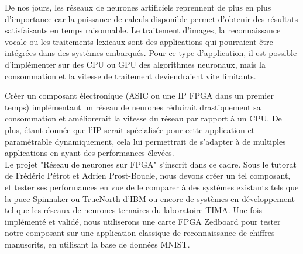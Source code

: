 De nos jours, les réseaux de neurones artificiels reprennent de plus en plus d'importance car la puissance de calculs disponible permet d'obtenir des résultats satisfaisants en temps raisonnable.
Le traitement d'images, la reconnaissance vocale ou les traitements lexicaux sont
des applications qui pourraient être intégrées dans des systèmes embarqués. Pour ce type d'application, il est possible
d'implémenter sur des CPU ou GPU des algorithmes neuronaux, mais la consommation et la vitesse de traitement deviendraient vite limitants.

Créer un composant électronique (ASIC ou une IP FPGA dans un premier temps) implémentant un réseau de neurones réduirait drastiquement sa consommation
et améliorerait la vitesse du réseau par rapport à un CPU.
De plus, étant donnée que l'IP serait spécialisée pour cette application et paramétrable dynamiquement,
cela lui permettrait de s'adapter à de multiples applications en ayant des performances élevées.\\

Le projet "Réseau de neurones sur FPGA" s'inscrit dans ce cadre. Sous le tutorat
de Frédéric Pétrot et Adrien Prost-Boucle, nous devons créer un tel composant,
et tester ses performances en vue de le comparer à des systèmes existants tels
que la puce Spinnaker ou TrueNorth d'IBM ou encore de systèmes en développement
tel que les réseaux de neurones ternaires du laboratoire TIMA. Une fois
implémenté et validé, nous utiliserons une carte FPGA Zedboard pour tester notre
composant sur une application classique de reconnaissance de chiffres manuscrits,
en utilisant la base de données MNIST.
